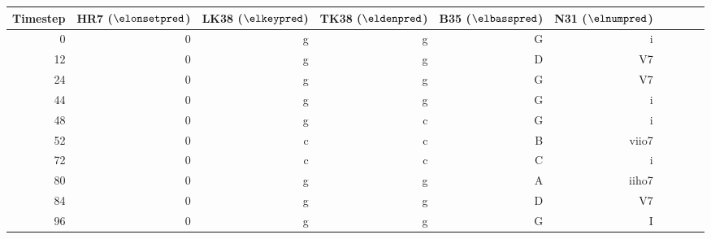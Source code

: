\begin{tabular}{r|rrrrrrrrr}
Timestep & HR7 ($\elonsetpred$) & LK38 ($\elkeypred$) & TK38
($\eldenpred$) & B35 ($\elbasspred$)  & N31 ($\elnumpred$)  \\ \hline
0        & 0   & g    & g    & G     & i     \\
12       & 0   & g    & g    & D     & V7    \\
24       & 0   & g    & g    & G     & V7    \\
44       & 0   & g    & g    & G     & i     \\ \hline
48       & 0   & g    & c    & G     & i     \\
52       & 0   & c    & c    & B     & viio7 \\
72       & 0   & c    & c    & C     & i     \\
80       & 0   & g    & g    & A     & iiho7 \\
84       & 0   & g    & g    & D     & V7    \\
96       & 0   & g    & g    & G     & I     \\
\end{tabular}

